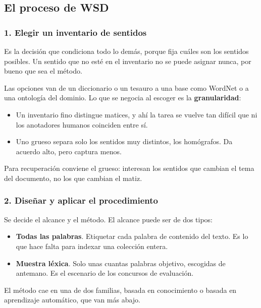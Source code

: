 \documentclass[11pt,letterpaper]{article}
\begin{document}
\subsection*{El proceso de WSD}

\subsubsection*{1. Elegir un inventario de sentidos}

Es la decisión que condiciona todo lo demás, porque fija cuáles son
los sentidos posibles. Un sentido que no esté en el inventario no se
puede asignar nunca, por bueno que sea el método.

Las opciones van de un diccionario o un tesauro a una base como
WordNet o a una ontología del dominio. Lo que se negocia al escoger es
la \textbf{granularidad}:

\begin{itemize}[itemsep=0.2em]
    \item Un inventario fino distingue matices, y ahí la tarea se
          vuelve tan difícil que ni los anotadores humanos coinciden
          entre sí.
    \item Uno grueso separa solo los sentidos muy distintos, los
          homógrafos. Da acuerdo alto, pero captura menos.
\end{itemize}

Para recuperación conviene el grueso: interesan los sentidos que
cambian el tema del documento, no los que cambian el matiz.

\subsubsection*{2. Diseñar y aplicar el procedimiento}

Se decide el alcance y el método. El alcance puede ser de dos tipos:

\begin{itemize}[itemsep=0.2em]
    \item \textbf{Todas las palabras}. Etiquetar cada palabra de
          contenido del texto. Es lo que hace falta para indexar una
          colección entera.
    \item \textbf{Muestra léxica}. Solo unas cuantas palabras
          objetivo, escogidas de antemano. Es el escenario de los
          concursos de evaluación.
\end{itemize}

El método cae en una de dos familias, basada en conocimiento o basada
en aprendizaje automático, que van más abajo.
\end{document}
